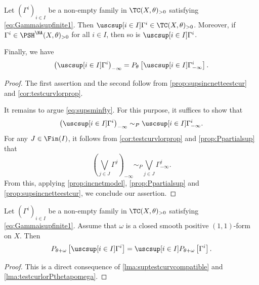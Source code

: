 \begin{proposition}\label{prop:suptcistc}
    Let $(\Gamma^i)_{i\in I}$ be a non-empty family in $\TC(X,\theta)_{>0}$ satisfying \eqref{eq:Gammaisupfinite1}. Then $\uscsup[i\in I]\Gamma^i\in \TC(X,\theta)_{>0}$. Moreover, if $\Gamma^i\in \PSH^{\NA}(X,\theta)_{>0}$ for all $i\in I$, then so is $\uscsup[i\in I]\Gamma^i$.

    Finally, we have
    \begin{equation}\label{eq:supsminfty}
        \left( \uscsup[i\in I]\Gamma^i \right)_{-\infty}=P_{\theta}\left[ \uscsup[i\in I]\Gamma^i_{-\infty} \right].
    \end{equation}
\end{proposition}
\begin{proof}
    The first assertion and the second follow from \cref{prop:supsincnetteestcur} and \cref{cor:testcurvlorprop}.

    It remains to argue \eqref{eq:supsminfty}. For this purpose, it suffices to show that
    \[
    \left( \uscsup[i\in I]\Gamma^i \right)_{-\infty}\sim_P \uscsup[i\in I]\Gamma^i_{-\infty}.
    \]
    For any $J\in \Fin(I)$, it follows from \cref{cor:testcurvlorprop} and \cref{prop:Ppartialsup} that
    \[
    \left(\bigvee_{j\in J}\Gamma^j\right)_{-\infty}\sim_P \bigvee_{j\in J}\Gamma^j_{-\infty}.
    \]
    From this, applying \cref{prop:incnetmodel}, \cref{prop:Ppartialsup} and \cref{prop:supsincnetteestcur}, we conclude our assertion.
\end{proof}

\begin{lemma}\label{lma:testcursupcompatible}
    Let $(\Gamma^i)_{i\in I}$ be a non-empty family in $\TC(X,\theta)_{>0}$ satisfying \eqref{eq:Gammaisupfinite1}. Assume that $\omega$ is a closed smooth positive $(1,1)$-form on $X$. Then
    \[
    P_{\theta+\omega}\left[ \uscsup[i\in I] \Gamma^{i} \right]= \uscsup[i\in I] P_{\theta+\omega}\left[ \Gamma^{i} \right].
    \]
\end{lemma}
\begin{proof}
    This is a direct consequence of \cref{lma:suptestcurvcompatible} and \cref{lma:testcurlorPthetapomega}.
\end{proof}

